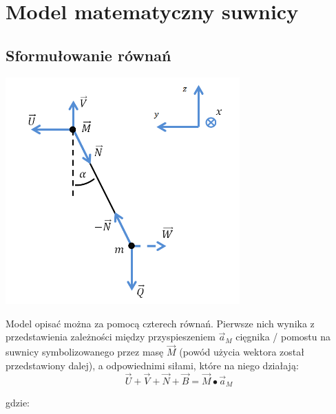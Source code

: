 \documentclass[10pt]{article}
\begin{document}
\setlength{\parindent}{0cm}


\section*{Model matematyczny suwnicy}
\subsection*{Sformułowanie równań}
\begin{center}
\includegraphics[width=9cm]{pic1}
\end{center}

Model opisać można za pomocą czterech równań. Pierwsze nich wynika z przedstawienia zależności między przyspieszeniem $\vec{a}_M$ cięgnika / pomostu na suwnicy symbolizowanego przez masę $\vec{M}$ (powód użycia wektora został przedstawiony dalej), a odpowiednimi siłami, które na niego działają:
\begin{equation}
\vec{U} + \vec{V} + \vec{N} + \vec{B} = \vec{M} \bullet \vec{a}_M
\end{equation}

gdzie:
\end{document}

